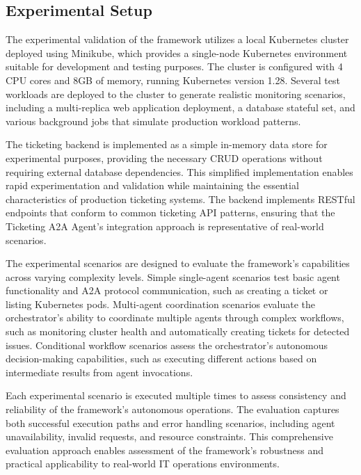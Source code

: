 \documentclass{article}
\begin{document}
\subsection{Experimental Setup}

The experimental validation of the framework utilizes a local Kubernetes cluster deployed using Minikube, which provides a single-node Kubernetes environment suitable for development and testing purposes. The cluster is configured with 4 CPU cores and 8GB of memory, running Kubernetes version 1.28. Several test workloads are deployed to the cluster to generate realistic monitoring scenarios, including a multi-replica web application deployment, a database stateful set, and various background jobs that simulate production workload patterns.

The ticketing backend is implemented as a simple in-memory data store for experimental purposes, providing the necessary CRUD operations without requiring external database dependencies. This simplified implementation enables rapid experimentation and validation while maintaining the essential characteristics of production ticketing systems. The backend implements RESTful endpoints that conform to common ticketing API patterns, ensuring that the Ticketing A2A Agent's integration approach is representative of real-world scenarios.

The experimental scenarios are designed to evaluate the framework's capabilities across varying complexity levels. Simple single-agent scenarios test basic agent functionality and A2A protocol communication, such as creating a ticket or listing Kubernetes pods. Multi-agent coordination scenarios evaluate the orchestrator's ability to coordinate multiple agents through complex workflows, such as monitoring cluster health and automatically creating tickets for detected issues. Conditional workflow scenarios assess the orchestrator's autonomous decision-making capabilities, such as executing different actions based on intermediate results from agent invocations.

Each experimental scenario is executed multiple times to assess consistency and reliability of the framework's autonomous operations. The evaluation captures both successful execution paths and error handling scenarios, including agent unavailability, invalid requests, and resource constraints. This comprehensive evaluation approach enables assessment of the framework's robustness and practical applicability to real-world IT operations environments.
\end{document}

